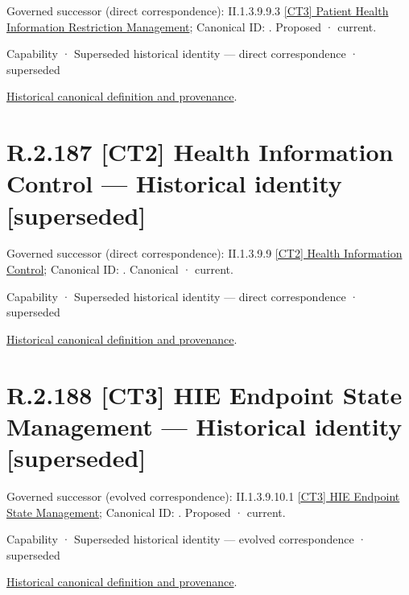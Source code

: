 {\small Governed successor (direct correspondence): II.1.3.9.9.3 \hyperref[element:262366990bda4ac4ace5429269cf6a98]{[CT3] Patient Health Information Restriction Management}; Canonical ID: \texttt{}. Proposed · current.}\par
\label{element:5ad91d045474435a96b560e66ff7de05}
{\small Capability · Superseded historical identity — direct correspondence · superseded}\par
\href{../../../../../../../continuum/strategy/capability/5ad91d045474435a96b560e66ff7de05.md}{Historical canonical definition and provenance}.\par
\section*{R.2.187 [CT2] Health Information Control — Historical identity [superseded]}
\label{navigation:R.2.187}

{\small Governed successor (direct correspondence): II.1.3.9.9 \hyperref[element:44cc0e17ad534675bf26dce6e46a68ff]{[CT2] Health Information Control}; Canonical ID: \texttt{}. Canonical · current.}\par
\label{element:a3196aef21d443519de874c24f64a185}
{\small Capability · Superseded historical identity — direct correspondence · superseded}\par
\href{../../../../../../../continuum/strategy/capability/a3196aef21d443519de874c24f64a185.md}{Historical canonical definition and provenance}.\par
\section*{R.2.188 [CT3] HIE Endpoint State Management — Historical identity [superseded]}
\label{navigation:R.2.188}

{\small Governed successor (evolved correspondence): II.1.3.9.10.1 \hyperref[element:1bec951a1c98450b8d4672c5c424f9bd]{[CT3] HIE Endpoint State Management}; Canonical ID: \texttt{}. Proposed · current.}\par
\label{element:697de08ac49a4b7f8df7a1ed6f04210e}
{\small Capability · Superseded historical identity — evolved correspondence · superseded}\par
\href{../../../../../../../continuum/strategy/capability/697de08ac49a4b7f8df7a1ed6f04210e.md}{Historical canonical definition and provenance}.\par
